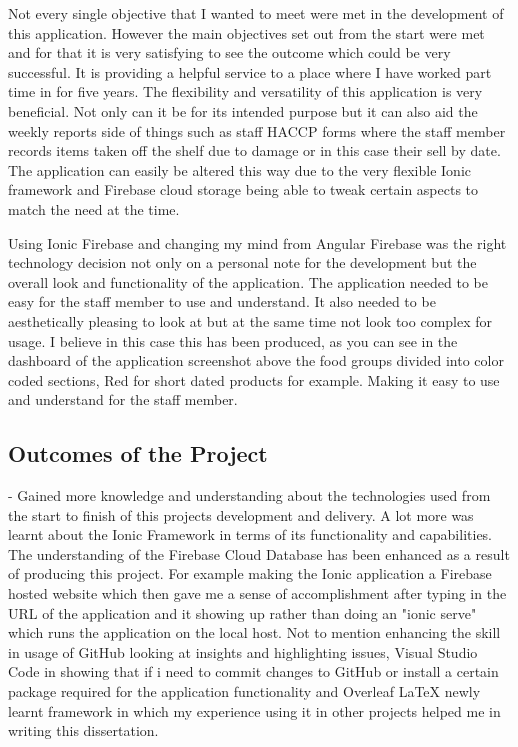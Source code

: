 Not every single objective that I wanted to meet were met in the development of this application. However the main objectives set out from the start were met and for that it is very satisfying to see the outcome which could be very successful. It is providing a helpful service to a place where I have worked part time in for five years. The flexibility and versatility of this application is very beneficial. Not only can it be for its intended purpose but it can also aid the weekly reports side of things such as staff HACCP forms where the staff member records items taken off the shelf due to damage or in this case their sell by date. The application can easily be altered this way due to the very flexible Ionic framework and Firebase cloud storage being able to tweak certain aspects to match the need at the time. 
\newline

Using Ionic Firebase and changing my mind from Angular Firebase was the right technology decision not only on a personal note for the development but the overall look and functionality of the application. The application needed to be easy for the staff member to use and understand. It also needed to be aesthetically pleasing to look at but at the same time not look too complex for usage. I believe in this case this has been produced, as you can see in the dashboard of the application screenshot above the food groups divided into color coded sections, Red for short dated products for example. Making it easy to use and understand for the staff member. 
\newline

\subsection{Outcomes of the Project}
- Gained more knowledge and understanding about the technologies used from the start to finish of this projects development and delivery. A lot more was learnt about the Ionic Framework in terms of its functionality and capabilities. The understanding of the Firebase Cloud Database has been enhanced as a result of producing this project. For example making the Ionic application a Firebase hosted website which then gave me a sense of accomplishment after typing in the URL of the application and it showing up rather than doing an "ionic serve" which runs the application on the local host. Not to mention enhancing the skill in usage of GitHub looking at insights and highlighting issues, Visual Studio Code in showing that if i need to commit changes to GitHub or install a certain package required for the application functionality and Overleaf LaTeX newly learnt framework in which my experience using it in other projects helped me in writing this dissertation.
\newline

